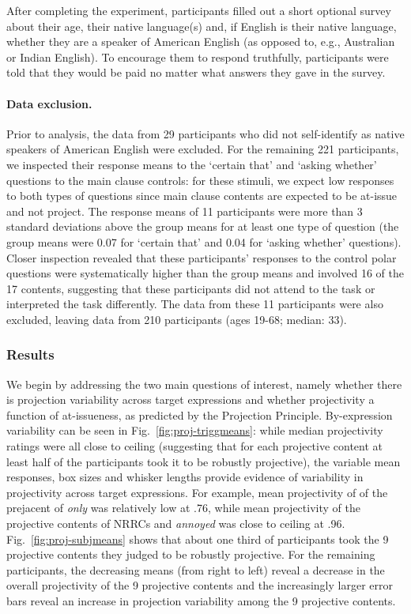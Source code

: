 \documentclass[11pt,fleqn]{article}
\newcommand{\6}{\mbox{$[\hspace*{-.6mm}[$}}
\newcommand{\9}{\mbox{$]\hspace*{-.6mm}]$}}
\newcommand{\figref}[1]{Fig.~\ref{#1}}
\begin{document}
After completing the experiment, participants filled out a short optional survey about their age, their native language(s) and, if English is their native language, whether they are a speaker of American English (as opposed to, e.g., Australian or Indian English). To encourage them to respond truthfully, participants were told that they would be paid no matter what answers they gave in the survey.

\paragraph{Data exclusion.}
Prior to analysis, the data from 29 participants who did not self-identify as native speakers of American English were excluded. For the remaining 221 participants, we inspected their response means to the `certain that' and `asking whether' questions 
to the main clause controls: for these stimuli, we expect low responses to both types of questions since main clause contents are expected to be at-issue and not project. The response means of 11 participants were more than 3 standard deviations above the group means for at least one type of question (the group means were 0.07 for `certain that' and 0.04 for `asking whether' questions). Closer inspection revealed that these participants' responses to the control polar questions were systematically higher than the group means and involved 16 of the 17 contents, suggesting that these participants did not attend to the task or interpreted the task differently. The data from these 11 participants were also excluded, leaving data from 210 participants (ages 19-68; median: 33).  


\subsubsection{Results}

We begin by addressing the two main questions of interest, namely whether there is projection variability across target expressions and whether projectivity a function of at-issueness, as predicted by the Projection Principle. By-expression variability can be seen in \figref{fig:proj-triggmeans}:  while median projectivity ratings were all close to ceiling (suggesting that for each projective content at least half of the participants took it to be robustly projective), the variable mean responses, box sizes and whisker lengths provide evidence of variability in projectivity across target expressions. For example, mean projectivity of of the prejacent of \emph{only} was relatively low at .76, while mean projectivity of the projective contents of NRRCs and \emph{annoyed} was close to ceiling at .96. \figref{fig:proj-subjmeans} shows that about one third of participants took the 9 projective contents they judged to be robustly projective. For the remaining participants, the decreasing means (from right to left) reveal a decrease in the overall projectivity of the 9 projective contents and the increasingly larger error bars reveal an increase in projection variability among the 9 projective contents. 
\end{document}
